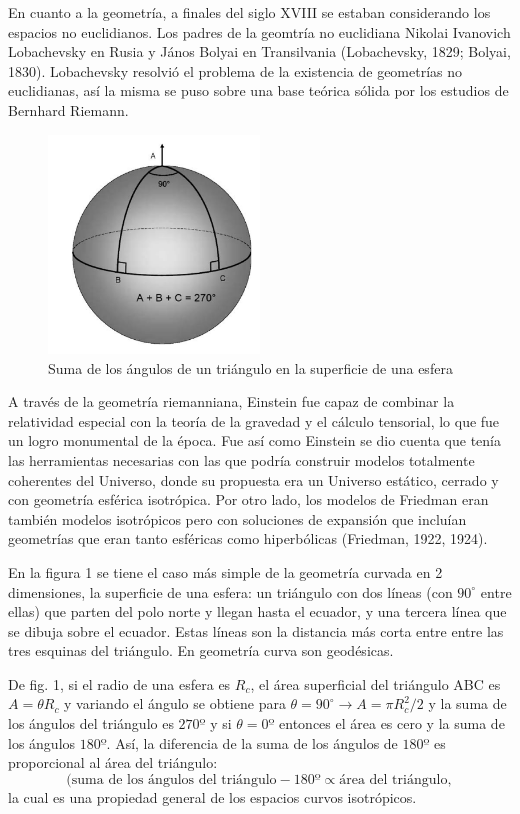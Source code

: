\documentclass{article}
\begin{document}
En cuanto a la geometría, a finales del siglo XVIII se estaban considerando los espacios no euclidianos. Los padres de la geomtría no euclidiana Nikolai Ivanovich Lobachevsky en Rusia y János Bolyai en Transilvania (Lobachevsky, 1829; Bolyai, 1830). Lobachevsky resolvió el problema de la existencia de geometrías no euclidianas, así la misma se puso sobre una base teórica sólida por los estudios de Bernhard Riemann. 

 \begin{figure}          \includegraphics[width=0.5\textwidth]{superficie_esferica_pp152.png}
    \caption{\footnotesize{Suma de los ángulos de un triángulo en la superficie de una esfera}}
    \end{figure}
    
A través de la geometría riemanniana, Einstein fue capaz de combinar la relatividad especial con la teoría de la gravedad y el cálculo tensorial, lo que fue un logro monumental de la época. Fue así como Einstein se dio cuenta que tenía las herramientas necesarias con las que podría construir modelos totalmente coherentes del Universo, donde su propuesta era un Universo estático, cerrado y con geometría esférica isotrópica. Por otro lado, los modelos de Friedman eran también modelos isotrópicos pero con soluciones de expansión que incluían geometrías que eran tanto esféricas como hiperbólicas (Friedman, 1922, 1924). 

En la figura 1 se tiene el caso más simple de la geometría curvada en 2 dimensiones, la superficie de una esfera: un triángulo con dos líneas (con $90^{\circ}$ entre ellas) que parten del polo norte y llegan hasta el ecuador, y una tercera línea que se dibuja sobre el ecuador. Estas líneas son la distancia más corta entre entre las tres esquinas del triángulo. En geometría curva son geodésicas. 

De fig. 1, si el radio de una esfera es $R_c$, el área superficial del triángulo ABC es $A= \theta R_c$ y variando el ángulo se obtiene para $\theta = 90^{\circ} \rightarrow{A = \pi R_c^2/2}$ y la suma de los ángulos del triángulo es $270º$ y si $\theta=0º$ entonces el área es cero y la suma de los ángulos $180º$. Así, la diferencia de la suma de los ángulos de $180º$ es proporcional al área del triángulo:
$$(\text{suma de los ángulos del triángulo} - 180º \propto \text{área del triángulo},$$
la cual es una propiedad general de los espacios curvos isotrópicos. 
\end{document}
